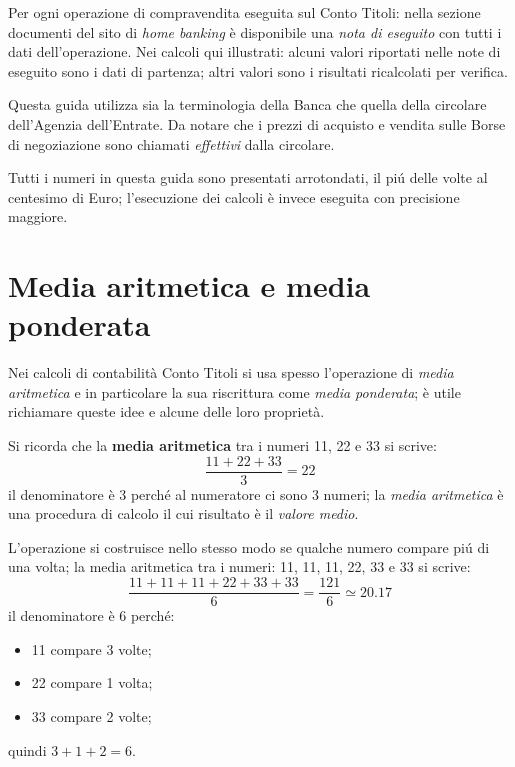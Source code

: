 \documentclass[12pt,a4paper]{article}
\begin{document}
Per ogni operazione di compravendita eseguita sul  Conto Titoli: nella sezione documenti del sito di
\emph{home banking} è disponibile una \emph{nota di eseguito} con tutti i dati dell'operazione.  Nei
calcoli qui  illustrati: alcuni valori  riportati nelle  note di eseguito  sono i dati  di partenza;
altri valori sono i risultati ricalcolati per verifica.

Questa  guida utilizza  sia la  terminologia  della Banca  che quella  della circolare  dell'Agenzia
dell'Entrate.   Da notare  che i  prezzi di  acquisto  e vendita  sulle Borse  di negoziazione  sono
chiamati \emph{effettivi} dalla circolare.

Tutti i numeri in questa guida sono presentati arrotondati, il piú delle volte al centesimo di Euro;
l'esecuzione dei calcoli è invece eseguita con precisione maggiore.

\section{Media aritmetica e media ponderata}


Nei calcoli di contabilità  Conto Titoli si usa spesso l'operazione di  \emph{media aritmetica} e in
particolare la sua riscrittura come \emph{media ponderata};  è utile richiamare queste idee e alcune
delle loro proprietà.

Si ricorda che la \textbf{media aritmetica} tra i numeri \num{11}, \num{22} e \num{33} si scrive:
\begin{equation*}
  \frac{\num{11} + \num{22} + \num{33}}{3} = \num{22}
\end{equation*}
il denominatore è \num{3} perché al numeratore  ci sono \num{3} numeri; la \emph{media aritmetica} è
una procedura di calcolo il cui risultato è il \emph{valore medio}.

L'operazione si costruisce  nello stesso modo se qualche  numero compare piú di una  volta; la media
aritmetica tra i numeri: \num{11}, \num{11}, \num{11}, \num{22}, \num{33} e \num{33} si scrive:
\begin{equation*}
  \frac{\num{11} + \num{11} + \num{11} + \num{22} + \num{33} + \num{33}}{6}
  = \frac{121}{6} \simeq \num{20,17}
\end{equation*}
il denominatore è \num{6} perché:
\begin{itemize}
\item \num{11} compare \num{3} volte;
\item \num{22} compare \num{1} volta;
\item \num{33} compare \num{2} volte;
\end{itemize}
quindi \(\num{3} + \num{1} + \num{2} = \num{6}\).
\end{document}
